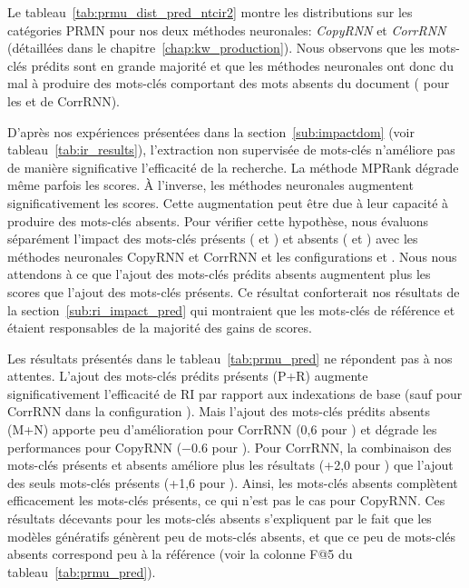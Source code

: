 

Le tableau~\ref{tab:prmu_dist_pred_ntcir2} montre les distributions sur les catégories PRMN pour nos deux méthodes neuronales: \emph{CopyRNN} et \emph{CorrRNN} (détaillées dans le chapitre~\ref{chap:kw_production}).
Nous observons que les mots-clés prédits sont en grande majorité \presents{} et que les méthodes neuronales ont donc du mal à produire des mots-clés comportant des mots absents du document ( pour les \mixtes{} et \nonvus{} de CorrRNN).


D'après nos expériences présentées dans la section~\ref{sub:impactdom} (voir tableau~\ref{tab:ir_results}), l'extraction non supervisée de mots-clés n'améliore pas de manière significative l'efficacité de la recherche. La méthode MPRank dégrade même parfois les scores.
\`A l'inverse, les méthodes neuronales augmentent significativement les scores.
Cette augmentation peut être due à leur capacité à produire des mots-clés absents.
Pour vérifier cette hypothèse, nous évaluons séparément l'impact des mots-clés présents (\presents{} et \reordonnes{}) et absents (\mixtes{} et \nonvus{}) avec les méthodes neuronales CopyRNN et CorrRNN et les configurations \tr{} et \trm{}.
Nous nous attendons à ce que l'ajout des mots-clés prédits absents augmentent plus les scores que l'ajout des mots-clés présents. Ce résultat conforterait nos résultats de la section~\ref{sub:ri_impact_pred} qui montraient que les mots-clés de référence \mixtes{} et \nonvus{} étaient responsables de la majorité des gains de scores.

%


Les résultats présentés dans le tableau~\ref{tab:prmu_pred} ne répondent pas à nos attentes. 
L'ajout des mots-clés prédits présents (P+R) augmente significativement l'efficacité de RI par rapport aux indexations de base (sauf pour CorrRNN dans la configuration \trm{}).
Mais l'ajout des mots-clés prédits absents (M+N) apporte peu d'amélioration pour CorrRNN (0,6 pour \tr{}) et dégrade les performances pour CopyRNN (\num{-0.6} pour \tr{}).
Pour CorrRNN, la combinaison des mots-clés présents et absents améliore plus les résultats (+2,0 pour \trm{}) que l'ajout des seuls mots-clés présents (+1,6 pour \trm{}).
Ainsi, les mots-clés absents complètent efficacement les mots-clés présents, ce qui n'est pas le cas pour CopyRNN.
Ces résultats décevants pour les mots-clés absents s'expliquent par le fait que les modèles génératifs génèrent peu de mots-clés absents, et que ce peu de mots-clés absents correspond peu à la référence (voir la colonne F@5 du tableau~\ref{tab:prmu_pred}).

